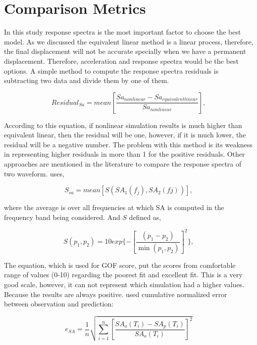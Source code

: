 \section{Comparison Metrics}

In this study response spectra is the most important factor to choose the best model. As we discussed the equivalent linear method is a linear process, therefore, the final displacement will not be accurate specially when we have a permanent displacement. Therefore, acceleration and response spectra would be the best options. A simple method to compute the response spectra residuals is subtracting two data and divide them by one of them. 


\begin{equation}
Residual_{Sa} = mean[\frac{Sa_{nonlinear} - Sa_{equivalent linear}}{Sa_{nonlinear}}],
\end{equation}

According to this equation, if nonlinear simulation results is much higher than equivalent linear, then the residual will be one, however, if it is much lower, the residual will be a negative number. The problem with this method is its weakness in representing higher residuals in more than 1 for the positive residuals.  Other approaches are mentioned in the literature to compare the response spectra of two waveform. \citet{Anderson_2004_Proc} uses,

\begin{equation}
S_{sa} = mean[S(SA_1(f_j),SA_2(fj))],
\end{equation}

where the average is over all frequencies at which SA is computed in the frequency band being considered. And $S $ defined as,

\begin{equation}
	S( p_1, p_2) = 10 exp \{ - [ \frac{(p_1 - p_2)}{ \min( p_1, p_2 ) }]^2 \},
\end{equation}

The equation, which is used for GOF score, put the scores from comfortable range of values (0-10) regarding the poorest fit and excellent fit. This is a very good scale, however, it can not represent which simulation had a higher values. Because the results are always positive.  \citet{Assimaki2008quantifying} used cumulative normalized error between observation and prediction:

\begin{equation}
e_{SA}=\frac{1}{n}\sqrt{\sum_{i=1}^{n}[\frac{SA_o(T_i)-SA_p(T_i)}{SA_o(T_i)}]^2}
\end{equation}

